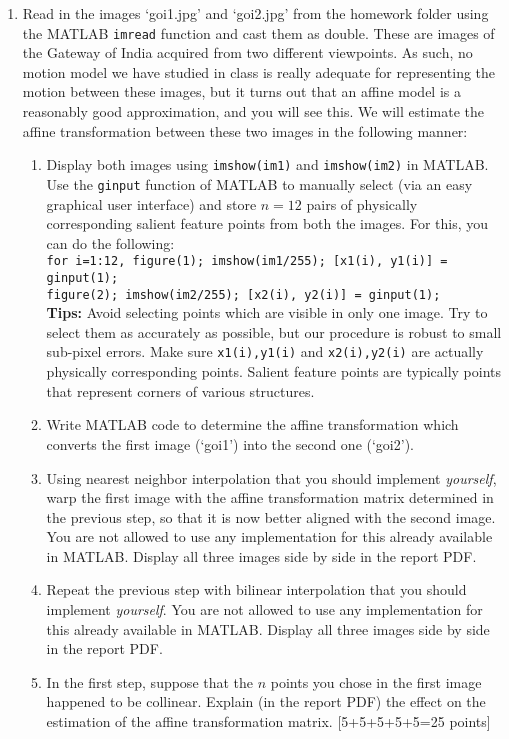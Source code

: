 \documentclass[11pt]{article}
\begin{document}
\begin{enumerate}
    \item Read in the images `goi1.jpg' and `goi2.jpg' from the homework folder using the MATLAB \texttt{imread} function and cast them as double. These are images of the Gateway of India acquired from two different viewpoints. As such, no motion model we have studied in class is really adequate for representing the motion between these images, but it turns out that an affine model is a reasonably good approximation, and you will see this. We will estimate the affine transformation between these two images in the following manner:
          \begin{enumerate}
              \item Display both images using \texttt{imshow(im1)} and \texttt{imshow(im2)} in MATLAB. Use the \texttt{ginput} function of MATLAB to manually select (via an easy graphical user interface) and store $n = 12$ pairs of physically corresponding salient feature points from both the images. For this, you can do the following: \\
                    \texttt{for i=1:12, figure(1); imshow(im1/255); [x1(i), y1(i)] = ginput(1); \\ figure(2); imshow(im2/255); [x2(i), y2(i)] = ginput(1);}\\
                    \textbf{Tips:} Avoid selecting points which are visible in only one image. Try to select them as accurately as possible, but our procedure is robust to small sub-pixel errors. Make sure \texttt{x1(i),y1(i)} and \texttt{x2(i),y2(i)} are actually physically corresponding points. Salient feature points are typically points that represent corners of various structures.
              \item Write MATLAB code to determine the affine transformation which converts the first image (`goi1') into the second one (`goi2').
              \item Using nearest neighbor interpolation that you should implement \emph{yourself}, warp the first image with the affine transformation matrix determined in the previous step, so that it is now better aligned with the second image. You are not allowed to use any implementation for this already available in MATLAB. Display all three images side by side in the report PDF.
              \item Repeat the previous step with bilinear interpolation that you should implement \emph{yourself}. You are not allowed to use any implementation for this already available in MATLAB. Display all three images side by side in the report PDF.
              \item In the first step, suppose that the $n$ points you chose in the first image happened to be collinear. Explain (in the report PDF) the effect on the estimation of the affine transformation matrix.
                    \textsf{[5+5+5+5+5=25 points]}
          \end{enumerate}


\end{enumerate}
\end{document}
